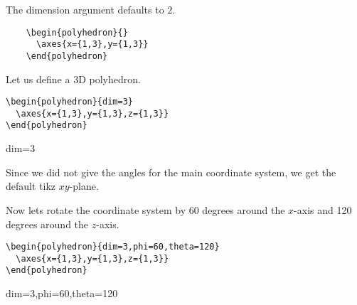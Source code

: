 \documentclass[a4paper,10pt]{article}
\begin{document}
The dimension argument defaults to $2$.


\begin{center}
  \begin{minipage}{0.6\textwidth}
  \begin{lstlisting}
    \begin{polyhedron}{}
      \axes{x={1,3},y={1,3}}
    \end{polyhedron}
  \end{lstlisting}
  \end{minipage}
  \qquad\qquad
  \begin{minipage}{0.2\textwidth}
    \begin{polyhedron}{}
    \end{polyhedron}
  \end{minipage}
\end{center}


Let us define a 3D polyhedron.

\begin{center}
  \begin{minipage}{0.6\textwidth}
  \begin{lstlisting}
\begin{polyhedron}{dim=3}
  \axes{x={1,3},y={1,3},z={1,3}}
\end{polyhedron}
  \end{lstlisting}
  \end{minipage}
  \qquad\qquad
  \begin{minipage}{0.2\textwidth}
    \begin{polyhedron}{dim=3}
    \end{polyhedron}
  \end{minipage}
\end{center}

Since we did not give the angles for the main coordinate system, we get the
default tikz $xy$-plane.

Now lets rotate the coordinate system by 60 degrees around the $x$-axis and
120 degrees around the $z$-axis.

\begin{center}
  \begin{minipage}{0.6\textwidth}
  \begin{lstlisting}
\begin{polyhedron}{dim=3,phi=60,theta=120}
  \axes{x={1,3},y={1,3},z={1,3}}
\end{polyhedron}
  \end{lstlisting}
  \end{minipage}
  \qquad\qquad
  \begin{minipage}{0.2\textwidth}
    \begin{polyhedron}{dim=3,phi=60,theta=120}
    \end{polyhedron}
  \end{minipage}
\end{center}
\end{document}
